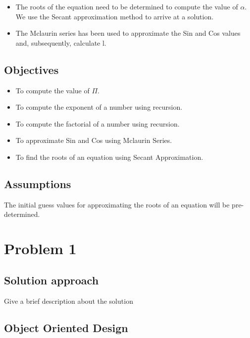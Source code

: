\documentclass{report}
\begin{document}
  \begin{itemize}
    \item {The roots of the equation need to be determined to compute the value of $\alpha$. We use the Secant approximation method to arrive at a solution.}
    \item {The Mclaurin series has been used to approximate the Sin and Cos values and, subsequently, calculate l.}
  \end{itemize}

\section{Objectives}
\begin{itemize}
  \item To compute the value of $\Pi$.
  \item To compute the exponent of a number using recursion.
  \item To compute the factorial of a number using recursion.
  \item To approximate Sin and Cos using Mclaurin Series.
  \item To find the roots of an equation using Secant Approximation.
\end{itemize}

\section{Assumptions}
  The initial guess values for approximating the roots of an equation will be pre-determined.

\chapter{Problem 1}
  \section{Solution approach}
    Give a brief description about the solution
    \pagebreak

  \section{Object Oriented Design}
\end{document}
